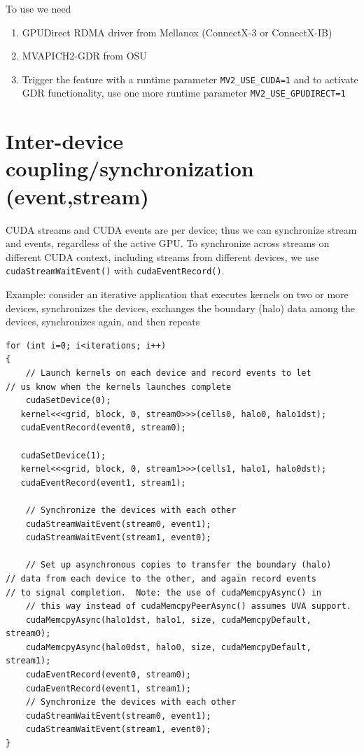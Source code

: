 To use we need 
\begin{enumerate}
  \item GPUDirect RDMA driver from Mellanox (ConnectX-3 or ConnectX-IB)
  
  \item MVAPICH2-GDR from OSU
  
  \item Trigger the feature with a runtime parameter \verb!MV2_USE_CUDA=1! and
  to activate GDR functionality, use one more runtime parameter
  \verb!MV2_USE_GPUDIRECT=1!
\end{enumerate}

\section{Inter-device coupling/synchronization (event,stream)}
\label{sec:GPUs_device-coupling}

CUDA streams and CUDA events are per device; thus we can synchronize stream and
events, regardless of the active GPU. To synchronize across streams on different
CUDA context, including streams from different devices, we use
\verb!cudaStreamWaitEvent()! with \verb!cudaEventRecord()!.


Example: consider an iterative application that executes kernels on two or more 
devices, synchronizes the devices, exchanges the boundary (halo) data among the 
devices, synchronizes again, and then repeats

\begin{lstlisting}
for (int i=0; i<iterations; i++)
{
    // Launch kernels on each device and record events to let
// us know when the kernels launches complete
    cudaSetDevice(0);
   kernel<<<grid, block, 0, stream0>>>(cells0, halo0, halo1dst);
   cudaEventRecord(event0, stream0);
   
   cudaSetDevice(1);
   kernel<<<grid, block, 0, stream1>>>(cells1, halo1, halo0dst);
   cudaEventRecord(event1, stream1);
   
    // Synchronize the devices with each other
    cudaStreamWaitEvent(stream0, event1);
    cudaStreamWaitEvent(stream1, event0);
   
    // Set up asynchronous copies to transfer the boundary (halo)
// data from each device to the other, and again record events
// to signal completion.  Note: the use of cudaMemcpyAsync() in
    // this way instead of cudaMemcpyPeerAsync() assumes UVA support.
    cudaMemcpyAsync(halo1dst, halo1, size, cudaMemcpyDefault, stream0);
    cudaMemcpyAsync(halo0dst, halo0, size, cudaMemcpyDefault, stream1);
    cudaEventRecord(event0, stream0);
    cudaEventRecord(event1, stream1);
    // Synchronize the devices with each other
    cudaStreamWaitEvent(stream0, event1);
    cudaStreamWaitEvent(stream1, event0);
}
\end{lstlisting}

